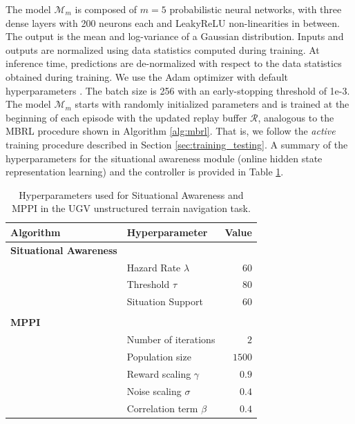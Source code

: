 \documentclass[Afour,sageh,times]{sagej}
\theoremstyle{lemma}
\begin{document}
The model $\mathcal{M}_m$ is composed of $m=5$ probabilistic neural networks, with three dense layers with 200 neurons each and LeakyReLU non-linearities in between. The output is the mean and log-variance of a Gaussian distribution. Inputs and outputs are normalized using data statistics computed during training. At inference time, predictions are de-normalized with respect to the data statistics obtained during training. We use the Adam optimizer with default hyperparameters \cite[]{kingma2014adam}. The batch size is 256 with an early-stopping threshold of 1e-3. The model $\mathcal{M}_m$ starts with randomly initialized parameters and is trained at the beginning of each episode with the updated replay buffer $\mathcal{R}$, analogous to the MBRL procedure shown in Algorithm \ref{alg:mbrl}. That is, we follow the \textit{active} training procedure described in Section \ref{sec:training_testing}. A summary of the hyperparameters for the situational awareness module (online hidden state representation learning) and the controller is provided in Table \ref{tab:combined_hyperparams_ugv}.

\begin{table} %
    \centering
    \small
    \begin{tabular}{llr}
    \toprule
    \textbf{Algorithm} & \textbf{Hyperparameter} & \multicolumn{1}{c}{\textbf{Value}} \\
    \midrule
    \textbf{Situational Awareness} & & \\
    & Hazard Rate $\lambda$ & $60$ \\
    & Threshold $\tau$ & $80$ \\
    & Situation Support & $60$ \\
    & & \\
    \midrule
    \multicolumn{3}{l}{\textbf{MPPI}} \\
    & Number of iterations & $2$ \\
    & Population size & $1500$ \\
    & Reward scaling $\gamma$ & $0.9$ \\
    & Noise scaling $\sigma$ & $0.4$ \\
    & Correlation term $\beta$ & $0.4$ \\
    \bottomrule
    \end{tabular}
    \caption{Hyperparameters used for Situational Awareness and MPPI in the UGV unstructured terrain navigation task.}
    \label{tab:combined_hyperparams_ugv}
\end{table}
\end{document}
